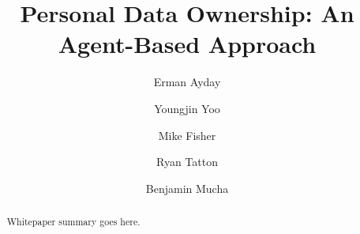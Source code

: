 \title{Personal Data Ownership: \newline An Agent-Based Approach}

\author{
    Erman Ayday \and
    Youngjin Yoo \and
    Mike Fisher \and
    Ryan Tatton \and
    Benjamin Mucha
}



\maketitle

\begin{abstract}
Whitepaper summary goes here.

\end{abstract}